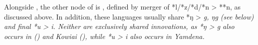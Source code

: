 Alongside ,
the other node of  is ,
defined by merger of *l/*z/*d/*n
> **n, as discussed above.
In addition, these languages usually share *ŋ > \it{g},
\it{ŋg} (see  below)
and final *u > \it{i}.
Neither are exclusively shared innovations,
as *ŋ > \it{g} also occurs in  ()
and Kowiai (), while *u > \it{i} also occurs in
Yamdena.
